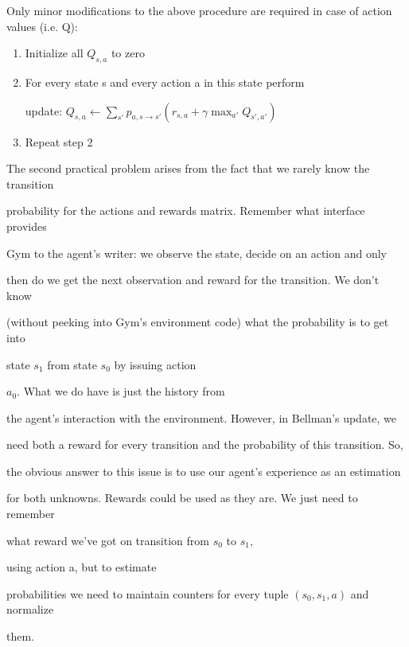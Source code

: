 Only minor modifications to the above procedure are required in case of action values (i.e. Q):



\begin{enumerate}

\item Initialize all \begin{math}Q_{s,a}\end{math} to zero

\item For every state s and every action a in this state perform

update: \begin{math}Q_{s,a} \leftarrow \sum_{s'}p_{a,s \rightarrow s'}(r_{s,a} + \gamma \max_{a'}Q_{s',a'})\end{math}

\item Repeat step 2

\end{enumerate}



The second practical problem arises from the fact that we rarely know the transition

probability for the actions and rewards matrix. Remember what interface provides

Gym to the agent’s writer: we observe the state, decide on an action and only

then do we get the next observation and reward for the transition. We don’t know

(without peeking into Gym’s environment code) what the probability is to get into

state \begin{math}s_1\end{math} from state \begin{math}s_0\end{math} by issuing action

\begin{math}a_0\end{math}. What we do have is just the history from

the agent’s interaction with the environment. However, in Bellman’s update, we

need both a reward for every transition and the probability of this transition. So,

the obvious answer to this issue is to use our agent’s experience as an estimation

for both unknowns. Rewards could be used as they are. We just need to remember

what reward we’ve got on transition from \begin{math}s_0\end{math} to \begin{math}s_1\end{math},

using action a, but to estimate

probabilities we need to maintain counters for every tuple \begin{math}(s_0, s_1, a)\end{math} and normalize

them.



